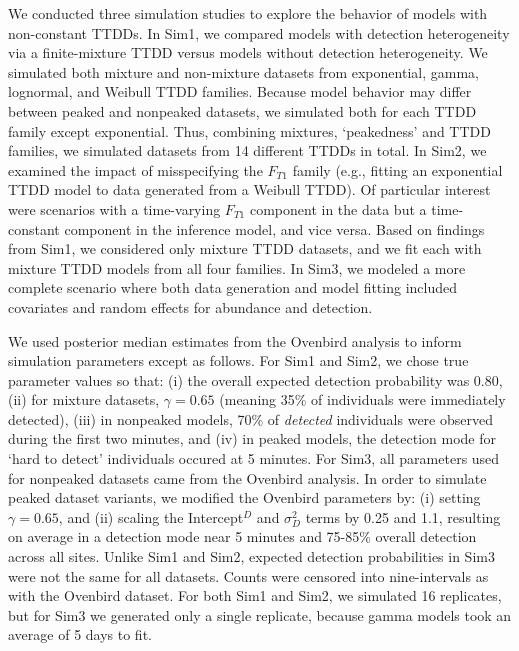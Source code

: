 \documentclass[useAMS,usenatbib,referee,12pt]{article}
\begin{document}
We conducted three simulation studies to explore the behavior of models with non-constant TTDDs.
In Sim1, we compared models with detection heterogeneity via a finite-mixture TTDD versus models without detection heterogeneity.
We simulated both mixture and non-mixture datasets from exponential, gamma, lognormal, and Weibull TTDD families.  
Because model behavior may differ between peaked and nonpeaked datasets, we simulated both for each TTDD family except exponential.  
Thus, combining mixtures, `peakedness' and TTDD families, we simulated datasets from 14 different TTDDs in total.  
In Sim2, we examined the impact of misspecifying the $F_{T1}$ family (e.g., fitting an exponential TTDD model to data generated from a Weibull TTDD).  
Of particular interest were scenarios with a time-varying $F_{T1}$ component in the data but a time-constant component in the inference model, and vice versa.
Based on findings from Sim1, we considered only mixture TTDD datasets, and we fit each with mixture TTDD models from all four families.  
In Sim3, we modeled a more complete scenario where both data generation and model fitting included covariates and random effects for abundance and detection.  

We used posterior median estimates from the Ovenbird analysis to inform simulation parameters except as follows.  
For Sim1 and Sim2, we chose true parameter values so that: (i) the overall expected detection probability was 0.80, (ii) for mixture datasets, $\gamma = 0.65$ (meaning 35\% of individuals were immediately detected), (iii) in nonpeaked models, 70\% of \textit{detected} individuals were observed during the first two minutes, and (iv) in peaked models, the detection mode for `hard to detect' individuals occured at 5 minutes.  
For Sim3, all parameters used for nonpeaked datasets came from the Ovenbird analysis.
In order to simulate peaked dataset variants, we modified the Ovenbird parameters by:  (i) setting $\gamma = 0.65$, and (ii) scaling the Intercept$^D$ and $\sigma_D^2$ terms by 0.25 and 1.1, resulting on average in a detection mode near 5 minutes and 75-85\% overall detection across all sites.  
Unlike Sim1 and Sim2, expected detection probabilities in Sim3 were not the same for all datasets.
Counts were censored into nine-intervals as with the Ovenbird dataset.  
For both Sim1 and Sim2, we simulated 16 replicates, but for Sim3 we generated only a single replicate, because gamma models took an average of 5 days to fit.
\end{document}
